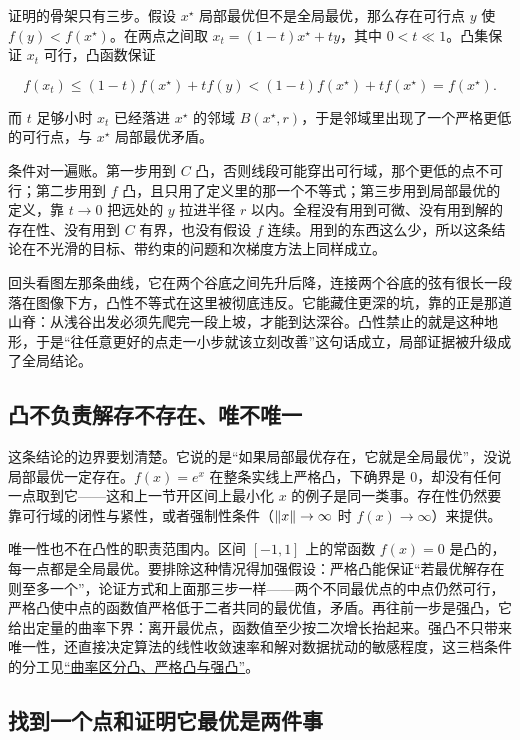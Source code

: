 证明的骨架只有三步。假设 \(x^\star\) 局部最优但不是全局最优，那么存在可行点 \(y\) 使 \(f(y)<f(x^\star)\)。在两点之间取 \(x_t=(1-t)x^\star+ty\)，其中 \(0<t\ll1\)。凸集保证 \(x_t\) 可行，凸函数保证

\[
f(x_t)\le(1-t)f(x^\star)+tf(y)<(1-t)f(x^\star)+tf(x^\star)=f(x^\star).
\]

而 \(t\) 足够小时 \(x_t\) 已经落进 \(x^\star\) 的邻域 \(B(x^\star,r)\)，于是邻域里出现了一个严格更低的可行点，与 \(x^\star\) 局部最优矛盾。

条件对一遍账。第一步用到 \(C\) 凸，否则线段可能穿出可行域，那个更低的点不可行；第二步用到 \(f\) 凸，且只用了定义里的那一个不等式；第三步用到局部最优的定义，靠 \(t\to0\) 把远处的 \(y\) 拉进半径 \(r\) 以内。全程没有用到可微、没有用到解的存在性、没有用到 \(C\) 有界，也没有假设 \(f\) 连续。用到的东西这么少，所以这条结论在不光滑的目标、带约束的问题和次梯度方法上同样成立。

回头看图左那条曲线，它在两个谷底之间先升后降，连接两个谷底的弦有很长一段落在图像下方，凸性不等式在这里被彻底违反。它能藏住更深的坑，靠的正是那道山脊：从浅谷出发必须先爬完一段上坡，才能到达深谷。凸性禁止的就是这种地形，于是``往任意更好的点走一小步就该立刻改善''这句话成立，局部证据被升级成了全局结论。

\subsection{凸不负责解存不存在、唯不唯一}

这条结论的边界要划清楚。它说的是``如果局部最优存在，它就是全局最优''，没说局部最优一定存在。\(f(x)=e^x\) 在整条实线上严格凸，下确界是 \(0\)，却没有任何一点取到它——这和上一节开区间上最小化 \(x\) 的例子是同一类事。存在性仍然要靠可行域的闭性与紧性，或者强制性条件（\(\left\lVert x\right\rVert\to\infty\) 时 \(f(x)\to\infty\)）来提供。

唯一性也不在凸性的职责范围内。区间 \([-1,1]\) 上的常函数 \(f(x)=0\) 是凸的，每一点都是全局最优。要排除这种情况得加强假设：严格凸能保证``若最优解存在则至多一个''，论证方式和上面那三步一样——两个不同最优点的中点仍然可行，严格凸使中点的函数值严格低于二者共同的最优值，矛盾。再往前一步是强凸，它给出定量的曲率下界：离开最优点，函数值至少按二次增长抬起来。强凸不只带来唯一性，还直接决定算法的线性收敛速率和解对数据扰动的敏感程度，这三档条件的分工见\hyperref[sec:09-Convex-Optimization/03-Convex-Functions/03]{``曲率区分凸、严格凸与强凸''}。

\subsection{找到一个点和证明它最优是两件事}

